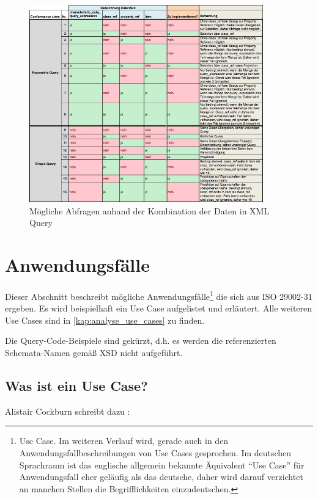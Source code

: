 \begin{figure}[htbp]
	\centering
		\includegraphics[width=0.90\textwidth]{images/queries.jpg}
	\caption{Mögliche Abfragen anhand der Kombination der Daten in XML Query}
	\label{fig:query_kombinationen}
\end{figure}

\section{Anwendungsfälle}\label{kap:Use_Cases}

Dieser Abschnitt beschreibt mögliche Anwendungsfälle\footnote{Use Case. Im weiteren Verlauf wird, gerade auch in den Anwendungsfallbeschreibungen von Use Cases gesprochen. Im deutschen Sprachraum ist das englische allgemein bekannte Äquivalent \enquote{Use Case} für Anwendungsfall eher geläufig als das deutsche, daher wird darauf verzichtet an manchen Stellen die Begrifflichkeiten einzudeutschen.} die sich aus ISO 29002-31 ergeben. 
Es wird beispielhaft ein Use Case aufgelistet und erläutert. Alle weiteren Use Cases sind in \autoref{kap:analyse_use_cases} zu finden. 

Die Query-Code-Beispiele sind gekürzt, d.h. es werden die referenzierten Schemata-Namen gemäß XSD nicht aufgeführt. 

\subsection{Was ist ein Use Case?}

Alistair Cockburn schreibt dazu \citep[Vergl.][Kap. 1.1]{cockburn2000}:

